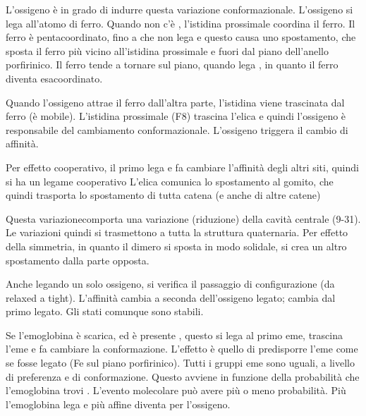 
L'ossigeno è in grado di indurre questa variazione conformazionale.
L'ossigeno si lega all'atomo di ferro. Quando non c'è ,
l'istidina prossimale coordina il ferro. Il ferro è pentacoordinato,
fino a che non lega  e questo causa uno spostamento, che sposta
il ferro più vicino all'istidina prossimale e fuori dal piano
dell'anello porfirinico.
Il ferro tende a tornare sul piano, quando lega , in quanto il
ferro diventa esacoordinato.



Quando l'ossigeno attrae il ferro dall'altra parte, l'istidina viene
trascinata dal ferro (è mobile). L'istidina prossimale (F8) trascina
l'elica e quindi l'ossigeno è responsabile del cambiamento
conformazionale. L'ossigeno triggera il cambio di affinità.

Per effetto cooperativo, il primo  lega e fa cambiare l'affinità
degli altri siti, quindi si ha un legame cooperativo
L'elica comunica lo spostamento al gomito, che quindi trasporta lo
spostamento di tutta catena (e anche di altre catene)


Questa variazionecomporta una variazione (riduzione) della cavità centrale (9-31). Le
variazioni quindi si trasmettono a tutta la struttura quaternaria. Per
effetto della simmetria, in quanto il dimero si sposta in modo solidale,
si crea un altro spostamento dalla parte opposta.


Anche legando un solo ossigeno, si verifica il passaggio di
configurazione (da relaxed a tight). L'affinità cambia a seconda
dell'ossigeno legato; cambia dal primo  legato.
Gli stati comunque sono stabili.

Se l'emoglobina è scarica, ed è presente , questo si lega al
primo eme, trascina l'eme e fa cambiare la conformazione.
L'effetto è quello di predisporre l'eme come se fosse legato (Fe sul
piano porfirinico). Tutti i gruppi eme sono uguali, a livello di
preferenza e di conformazione.
Questo avviene in funzione della probabilità che l'emoglobina trovi
. L'evento molecolare può avere più o meno probabilità.
Più l'emoglobina lega  e più affine diventa per l'ossigeno.


